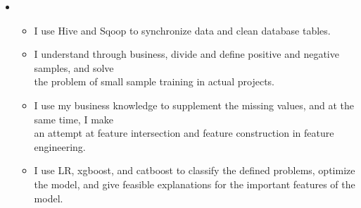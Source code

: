 \begin{itemize}[leftmargin=*]
{             }
       \item
           {\small
      \begin{itemize}
      \item I use Hive and Sqoop to synchronize data and clean database tables.
         \item I understand through business, divide and define positive and negative samples, and solve \\the problem of small sample training in actual projects.
          \item I use my business knowledge to supplement the missing values, and at the same time, I make\\ an attempt at feature intersection and feature construction in feature engineering.
           \item  I use LR, xgboost, and catboost to classify the defined problems, optimize the model, and give feasible explanations for the important features of the model.
            \end{itemize}

             }
  \end{itemize}


















